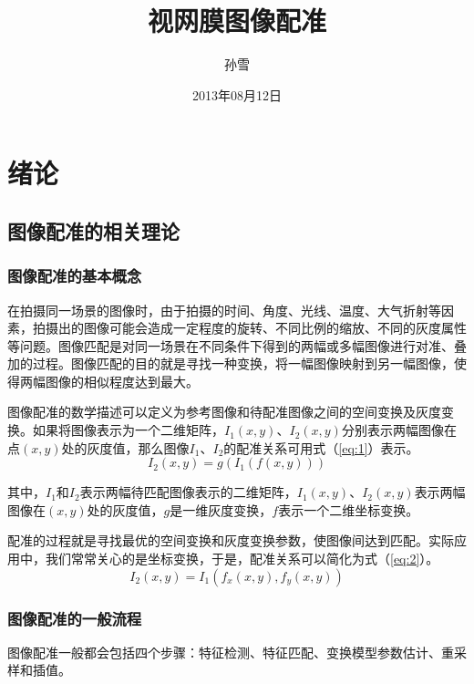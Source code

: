 \documentclass[a4paper,12pt]{article}
\title{视网膜图像配准} %
\author{孙雪}  %
\date{2013年08月12日} %
\begin{document}
\maketitle
\tableofcontents %
\newpage
\section{绪论}

\subsection{图像配准的相关理论}

\subsubsection{图像配准的基本概念}

在拍摄同一场景的图像时，由于拍摄的时间、角度、光线、温度、大气折射等因素，拍摄出的图像可能会造成一定程度的旋转、不同比例的缩放、不同的灰度属性等问题。图像匹配是对同一场景在不同条件下得到的两幅或多幅图像进行对准、叠加的过程。图像匹配的目的就是寻找一种变换，将一幅图像映射到另一幅图像，使得两幅图像的相似程度达到最大。

图像配准的数学描述可以定义为参考图像和待配准图像之间的空间变换及灰度变换。如果将图像表示为一个二维矩阵，$I_1(x,y)$、$I_2(x,y)$分别表示两幅图像在点$(x,y)$处的灰度值，那么图像$I_1$、$I_2$的配准关系可用式（\ref{eq:1}）表示。
\begin{equation} 
\label{eq:1}
I_2(x,y)=g(I_1(f(x,y)))
\end{equation}

其中，$I_1$和$I_2$表示两幅待匹配图像表示的二维矩阵，$I_1(x,y)$、$I_2(x,y)$表示两幅图像在$(x,y)$处的灰度值，$g$是一维灰度变换，$f$表示一个二维坐标变换。

配准的过程就是寻找最优的空间变换和灰度变换参数，使图像间达到匹配。实际应用中，我们常常关心的是坐标变换，于是，配准关系可以简化为式（\ref{eq:2}）。
\begin{equation} 
\label{eq:2}
I_2(x,y)=I_1(f_x(x,y),f_y(x,y))
\end{equation}

\subsubsection{图像配准的一般流程}

图像配准一般都会包括四个步骤：特征检测、特征匹配、变换模型参数估计、重采样和插值。
\end{document}
